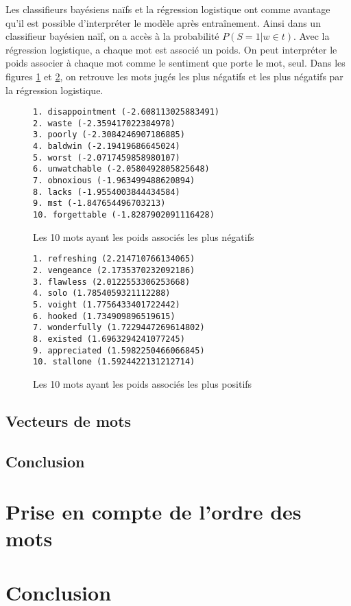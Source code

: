 \documentclass{article}
\begin{document}
Les classifieurs bayésiens naïfs et la régression logistique ont comme avantage qu'il est possible d'interpréter le modèle après entraînement. Ainsi dans un classifieur bayésien naïf, on a accès à la probabilité $P(S=1|w \in t)$. Avec la régression logistique, a chaque mot est associé un poids. On peut interpréter le poids associer à chaque mot comme le sentiment que porte le mot, seul. Dans les figures \ref{negative} et \ref{positive}, on retrouve les mots jugés les plus négatifs et les plus négatifs par la régression logistique.

\begin{figure}[h]
\begin{verbatim}
1. disappointment (-2.608113025883491)
2. waste (-2.359417022384978)
3. poorly (-2.3084246907186885)
4. baldwin (-2.19419686645024)
5. worst (-2.0717459858980107)
6. unwatchable (-2.0580492805825648)
7. obnoxious (-1.963499488620894)
8. lacks (-1.9554003844434584)
9. mst (-1.847654496703213)
10. forgettable (-1.8287902091116428)
\end{verbatim}
\caption{Les 10 mots ayant les poids associés les plus négatifs}
\label{negative}
\end{figure}

\begin{figure}[h]
\begin{verbatim}
1. refreshing (2.214710766134065)
2. vengeance (2.1735370232092186)
3. flawless (2.0122553306253668)
4. solo (1.7854059321112288)
5. voight (1.7756433401722442)
6. hooked (1.734909896519615)
7. wonderfully (1.7229447269614802)
8. existed (1.6963294241077245)
9. appreciated (1.5982250466066845)
10. stallone (1.5924422131212714)
\end{verbatim}
\caption{Les 10 mots ayant les poids associés les plus positifs}
\label{positive}
\end{figure}



\subsection{Vecteurs de mots}


\subsection{Conclusion}




\section{Prise en compte de l'ordre des mots}

\section{Conclusion}



\end{document}
